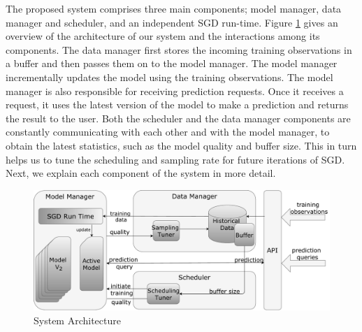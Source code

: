 The proposed system comprises three main components; model manager, data manager and scheduler, and an independent SGD run-time. 
Figure \ref{fig:system-architecture} gives an overview of the architecture of our system and the interactions among its components.
The data manager first stores the incoming training observations in a buffer and then passes them on to the model manager.
The model manager incrementally updates the model using the training observations.
The model manager is also responsible for receiving prediction requests.
Once it receives a request, it uses the latest version of the model to make a prediction and returns the result to the user.
Both the scheduler and the data manager components are constantly communicating with each other and with the model manager, to obtain the latest statistics, such as the model quality and buffer size.
This in turn helps us to tune the scheduling and sampling rate for future iterations of SGD. 
Next, we explain each component of the system in more detail.


\begin{figure}[t]
\centering
\includegraphics[width=\columnwidth]{../images/system-architecture-final.pdf}
\caption{System Architecture}
\label{fig:system-architecture}
\end{figure}


